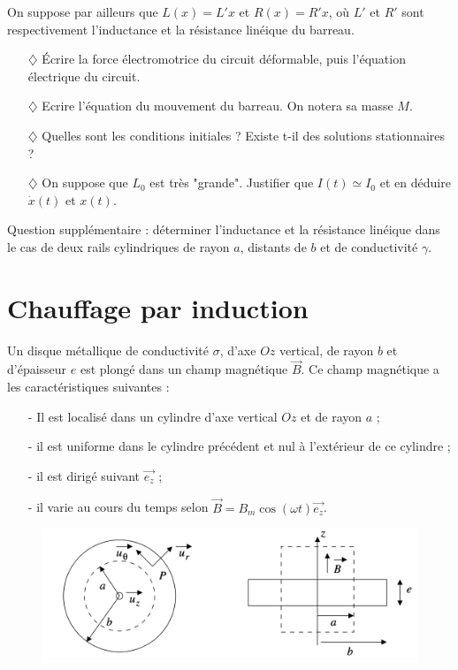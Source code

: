 \documentclass{report}
\begin{document}
On suppose par ailleurs que $L(x)=L'x$ et $R(x)=R'x$, où $L'$ et $R'$ sont respectivement l'inductance et la résistance linéique du barreau.

\begin{itemize}

	\item[$\diamondsuit$] Écrire la force électromotrice du circuit déformable, puis l'équation électrique du circuit. 
	
	\item[$\diamondsuit$] Ecrire l'équation du mouvement du barreau. On notera sa masse $M$. 
	
	\item[$\diamondsuit$] Quelles sont les conditions initiales ? Existe t-il des solutions stationnaires ?
	
	\item[$\diamondsuit$] On suppose que $L_0$ est très "grande". Justifier que $I(t)\simeq I_0$ et en déduire $\dot{x}(t)$ et $x(t)$.

\end{itemize}

Question supplémentaire : déterminer l'inductance et la résistance linéique dans le cas de deux rails cylindriques de rayon $a$, distants de $b$ et de conductivité $\gamma$.

\newpage

\section*{Chauffage par induction}

Un disque métallique de conductivité $\sigma$, d'axe $Oz$ vertical, de rayon $b$ et d'épaisseur $e$ est plongé dans un champ magnétique $\vec{B}$. Ce champ magnétique a les caractéristiques suivantes :
\begin{itemize}

\item[-] Il est localisé dans un cylindre d'axe vertical $Oz$ et de rayon $a$ ;
\item[-] il est uniforme dans le cylindre précédent et nul à l'extérieur de ce cylindre ;
\item[-] il est dirigé suivant $\vec{e_z}$ ;
\item[-] il varie au cours du temps selon $\vec{B}=B_m\cos(\omega t)\vec{e_z}$.

\end{itemize}

\begin{figure}[h!]
\centering
		\includegraphics[scale=0.25]{induction3.png}
\end{figure}
\end{document}
